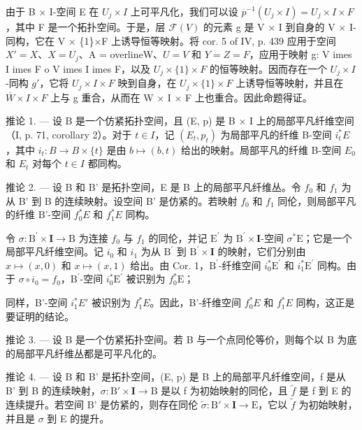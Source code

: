 由于 B × I-空间 E 在 \(U_{j} \times I\) 上可平凡化，我们可以设 \(\overline{p}^{-1}(U_{j} \times I) = U_{j} \times I \times F\)，其中 F 是一个拓扑空间。于是，层 \(\mathcal{F}(V)\) 的元素 g 是 V × I 到自身的 V × I-同构，它在 V × \{1\}×F 上诱导恒等映射。将 cor. 5 of IV, p. 439 应用于空间 \(X' = X\)、\(X = U_{j}\)、A = overline{W}、\(U = V\) 和 \(Y = Z = F\)，应用于映射 g: V 	imes I 	imes F 	o V 	imes I 	imes F，以及 \(U_{j} \times \{1\} \times F\) 的恒等映射。因而存在一个 \(U_{j} \times I\)-同构 \(g'\)，它将 \(U_{j} \times I \times F\) 映到自身，在 \(U_{j} \times \{1\} \times F\) 上诱导恒等映射，并且在 \(\overline{W} \times I \times F\) 上与 g 重合，从而在 W × I × F 上也重合。因此命题得证。

推论 1. --- 设 B 是一个仿紧拓扑空间，且 (E, p) 是 B × I 上的局部平凡纤维空间（I, p. 71, corollary 2）。对于 \(t \in I\)，记 \((E_{t}, p_{t})\) 为局部平凡的纤维 B-空间 \(i_{t}^{*}E\)，其中 \(i_{t} \colon B \to B \times \{t\}\) 是由 \(b \mapsto (b, t)\) 给出的映射。局部平凡的纤维 B-空间 \(E_{0}\) 和 \(E_{t}\) 对每个 \(t \in I\) 都同构。

推论 2. --- 设 B 和 B' 是拓扑空间，E 是 B 上的局部平凡纤维丛。令 \(f_0\) 和 \(f_1\) 为从 B' 到 B 的连续映射。设空间 B' 是仿紧的。若映射 \(f_0\) 和 \(f_1\) 同伦，则局部平凡的纤维 B'-空间 \(f_0^*E\) 和 \(f_1^*E\) 同构。

令 \(\sigma\colon\mathrm{B}^{\prime}\times\mathbf{I}\to\mathrm{B}\) 为连接 \(f_{0}\) 与 \(f_{1}\) 的同伦，并记 \(\mathrm{E}^{\prime}\) 为 \(\mathrm{B}^{\prime}\times\mathbf{I}\)-空间 \(\sigma^{*}\mathrm{E}\)；它是一个局部平凡纤维空间。记 \(i_{0}\) 和 \(i_{1}\) 为从 \(\mathrm{B}^{\prime}\) 到 \(\mathrm{B}^{\prime}\times\mathbf{I}\) 的映射，它们分别由 \(x\mapsto(x,0)\) 和 \(x\mapsto(x,1)\) 给出。由 Cor. 1，\(\mathrm{B}^{\prime}\)-纤维空间 \(i_{0}^{*}\mathrm{E}^{\prime}\) 和 \(i_{1}^{*}\mathrm{E}^{\prime}\) 同构。由于 \(\sigma\circ i_{0}=f_{0}\)，\(\mathrm{B}^{\prime}\)-空间 \(i_{0}^{*}\mathrm{E}^{\prime}\) 被识别为 \(f_{0}^{*}\mathrm{E}\)；

同样，B'-空间 \(i_{1}^{*}E'\) 被识别为 \(f_{1}^{*}E\)。因此，B'-纤维空间 \(f_{0}^{*}E\) 和 \(f_{1}^{*}E\) 同构，这正是要证明的结论。

推论 3. --- 设 B 是一个仿紧拓扑空间。若 B 与一个点同伦等价，则每个以 B 为底的局部平凡纤维丛都是可平凡化的。

推论 4. --- 设 B 和 B' 是拓扑空间，(E, p) 是 B 上的局部平凡纤维空间，f 是从 B' 到 B 的连续映射，\(\sigma: \mathrm{B}' \times \mathbf{I} \to \mathrm{B}\) 是以 f 为初始映射的同伦，且 \(\widetilde{f}\) 是 f 到 E 的连续提升。若空间 B' 是仿紧的，则存在同伦 \(\widetilde{\sigma}: \mathrm{B}' \times \mathbf{I} \to \mathrm{E}\)，它以 \(\widetilde{f}\) 为初始映射，并且是 \(\sigma\) 到 E 的提升。

